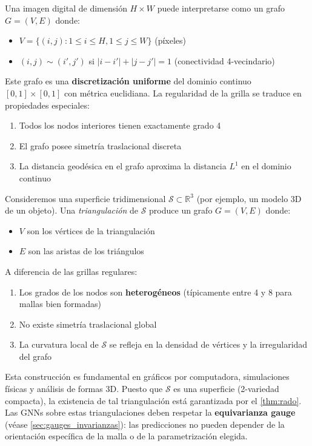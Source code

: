 \begin{example}\label{ex:imagen_grafo_grilla}
	Una imagen digital de dimensión $H \times W$ puede interpretarse como un grafo $G = (V,E)$ donde:
	\begin{itemize}
		\item $V = \{(i,j) : 1 \leq i \leq H, 1 \leq j \leq W\}$ (píxeles)
		\item $(i,j) \sim (i',j')$ si $|i-i'| + |j-j'| = 1$ (conectividad 4-vecindario)
	\end{itemize}

	Este grafo es una \textbf{discretización uniforme} del dominio continuo $[0,1] \times [0,1]$ con métrica euclidiana. La regularidad de la grilla se traduce en propiedades especiales:
	\begin{enumerate}
		\item Todos los nodos interiores tienen exactamente grado 4
		\item El grafo posee simetría traslacional discreta
		\item La distancia geodésica en el grafo aproxima la distancia $L^1$ en el dominio continuo
	\end{enumerate}
\end{example}

\begin{example}\label{ex:superficie_triangulada}
	Consideremos una superficie tridimensional $\mathcal{S} \subset \mathbb{R}^3$ (por ejemplo, un modelo 3D de un objeto). Una \textit{triangulación} de $\mathcal{S}$ produce un grafo $G = (V,E)$ donde:
	\begin{itemize}
		\item $V$ son los vértices de la triangulación
		\item $E$ son las aristas de los triángulos
	\end{itemize}

	A diferencia de las grillas regulares:
	\begin{enumerate}
		\item Los grados de los nodos son \textbf{heterogéneos} (típicamente entre 4 y 8 para mallas bien formadas)
		\item No existe simetría traslacional global
		\item La curvatura local de $\mathcal{S}$ se refleja en la densidad de vértices y la irregularidad del grafo
	\end{enumerate}

	Esta construcción es fundamental en gráficos por computadora, simulaciones físicas y análisis de formas 3D. Puesto que $\mathcal{S}$ es una superficie (2-variedad compacta), la existencia de tal triangulación está garantizada por el \autoref{thm:rado}. Las \glspl{GNN} sobre estas triangulaciones deben respetar la \textbf{equivarianza gauge} (véase \autoref{sec:gauges_invarianzas}): las predicciones no pueden depender de la orientación específica de la malla o de la parametrización elegida.
\end{example}

